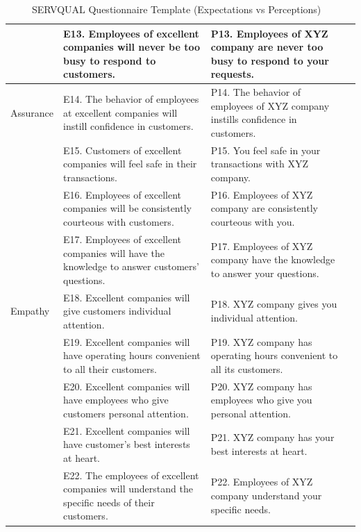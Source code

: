 \begin{table}[ht]
\begin{tabular}{p{2.5cm} p{6cm} p{6cm} p{1.5cm}}
 & E13. Employees of excellent companies will never be too busy to respond to customers. & P13. Employees of XYZ company are never too busy to respond to your requests. & \\
\hline
Assurance & E14. The behavior of employees at excellent companies will instill confidence in customers. & P14. The behavior of employees of XYZ company instills confidence in customers. & \\
 & E15. Customers of excellent companies will feel safe in their transactions. & P15. You feel safe in your transactions with XYZ company. & \\
 & E16. Employees of excellent companies will be consistently courteous with customers. & P16. Employees of XYZ company are consistently courteous with you. & \\
 & E17. Employees of excellent companies will have the knowledge to answer customers’ questions. & P17. Employees of XYZ company have the knowledge to answer your questions. & \\
\hline
Empathy & E18. Excellent companies will give customers individual attention. & P18. XYZ company gives you individual attention. & \\
 & E19. Excellent companies will have operating hours convenient to all their customers. & P19. XYZ company has operating hours convenient to all its customers. & \\
 & E20. Excellent companies will have employees who give customers personal attention. & P20. XYZ company has employees who give you personal attention. & \\
 & E21. Excellent companies will have customer’s best interests at heart. & P21. XYZ company has your best interests at heart. & \\
 & E22. The employees of excellent companies will understand the specific needs of their customers. & P22. Employees of XYZ company understand your specific needs. & \\
\hline
\end{tabular}
\caption{SERVQUAL Questionnaire Template (Expectations vs Perceptions) ~\cite{master_servqual_model}} 
\label{table:servqual_template}
\end{table}



